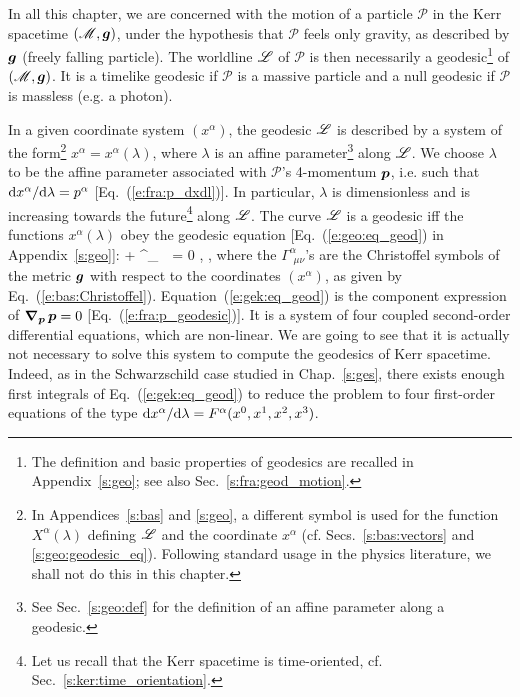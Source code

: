 In all this chapter, we are concerned with the motion of a particle
$\mathscr{P}$ in the Kerr spacetime $(\mathscr{M},\bm{g})$, under the hypothesis that $\mathscr{P}$
feels only gravity, as described by $\bm{g}$ (freely falling particle).
The worldline $\mathscr{L}$ of $\mathscr{P}$
is then necessarily a geodesic\footnote{The definition and basic properties of geodesics
are recalled in Appendix~\ref{s:geo}; see also Sec.~\ref{s:fra:geod_motion}.} of
$(\mathscr{M},\bm{g})$. It is a timelike geodesic if $\mathscr{P}$ is a massive particle
and a null geodesic if $\mathscr{P}$ is massless (e.g. a photon).

In a given coordinate system $(x^\alpha)$, the geodesic $\mathscr{L}$ is described
by a system of the form\footnote{In Appendices~\ref{s:bas} and \ref{s:geo},
a different symbol is used for the function $X^\alpha(\lambda)$ defining
$\mathscr{L}$ and the coordinate $x^\alpha$ (cf. Secs.~\ref{s:bas:vectors} and
\ref{s:geo:geodesic_eq}). Following standard usage in the physics literature,
we shall not do this in this chapter.}
$x^\alpha = x^\alpha(\lambda)$, where $\lambda$ is an
affine parameter\footnote{See Sec.~\ref{s:geo:def} for the definition
of an affine parameter along a geodesic.} along $\mathscr{L}$. We choose $\lambda$ to be the affine parameter
associated with $\mathscr{P}$'s 4-momentum $\bm{p}$,
i.e. such that $\mathrm{d} x^\alpha / \mathrm{d}\lambda = p^\alpha$ [Eq.~(\ref{e:fra:p_dxdl})].
In particular, $\lambda$ is dimensionless and is increasing towards the future\footnote{Let us recall that the Kerr spacetime is time-oriented, cf. Sec.~\ref{s:ker:time_orientation}.} along $\mathscr{L}$.
The curve $\mathscr{L}$ is a geodesic iff the functions $x^\alpha(\lambda)$ obey
the geodesic equation [Eq.~(\ref{e:geo:eq_geod}) in Appendix~\ref{s:geo}]:
\be \label{e:gek:eq_geod}
     + \Gamma^\alpha_{\ \, \mu \nu}
      = 0 , \leq \alpha {},
\ee
where the $\Gamma^\alpha_{\ \, \mu \nu}$'s are the Christoffel symbols of the metric $\bm{g}$
with respect to the coordinates $(x^\alpha)$, as given by Eq.~(\ref{e:bas:Christoffel}).
Equation~(\ref{e:gek:eq_geod}) is the component expression of
$\bm{\nabla}_{\bm{p}} \, \bm{p} = 0$ [Eq.~(\ref{e:fra:p_geodesic})]. It is
a system of four coupled second-order
differential equations, which are non-linear. We are going to see that it is actually not necessary to
solve this system to compute the geodesics of Kerr spacetime. Indeed,
as in the Schwarzschild case studied in Chap.~\ref{s:ges}, there exists
enough first integrals of Eq.~(\ref{e:gek:eq_geod}) to reduce
the problem to four first-order equations
of the type $\mathrm{d} x^\alpha/\mathrm{d}\lambda = F^\alpha(x^0, x^1, x^2, x^3)$.

